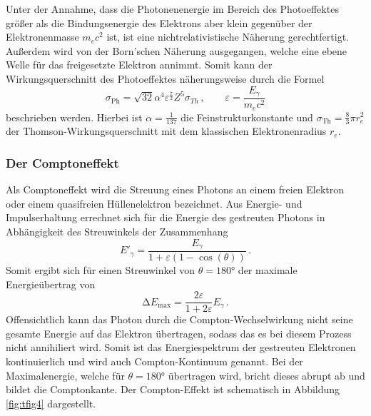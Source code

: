 Unter der Annahme, dass die Photonenenergie im Bereich des Photoeffektes größer als die Bindungsenergie des Elektrons aber klein gegenüber der Elektronenmasse $m_ec^2$ ist, ist eine nichtrelativistische Näherung gerechtfertigt.
Außerdem wird von der Born'schen Näherung ausgegangen, welche eine ebene Welle für das freigesetzte Elektron annimmt.
Somit kann der Wirkungsquerschnitt des Photoeffektes näherungsweise durch die Formel \cite{quelle03}
\begin{equation}
\sigma_{\text{Ph}}=\sqrt{32}\alpha^4 \varepsilon^\frac{7}{2}Z^5\sigma_{Th}\, , \qquad \varepsilon = \frac{E_{\gamma}}{m_e c^2}
\end{equation}
beschrieben werden.
Hierbei ist $\alpha = \frac{1}{137}$ die Feinstrukturkonstante und $\sigma_{\text{Th}}=\frac{8}{3}\pi r_e^2$ der Thomson-Wirkungsquerschnitt mit dem klassischen Elektronenradius $r_e$.

\subsubsection*{Der Comptoneffekt}
Als Comptoneffekt wird die Streuung eines Photons an einem freien Elektron oder einem quasifreien Hüllenelektron bezeichnet.
Aus Energie- und Impulserhaltung errechnet sich für die Energie des gestreuten Photons in Abhängigkeit des Streuwinkels der Zusammenhang
\begin{equation}
E'_{\gamma} = \frac{E_{\gamma}}{1 + \varepsilon(1-\cos(\theta))} \, .
\end{equation}
Somit ergibt sich für einen Streuwinkel von $\theta = 180°$ der maximale Energieübertrag von
\begin{equation}
\label{eq:compton}
\increment E_\text{max} = \frac{2\varepsilon}{1 + 2 \varepsilon} E_{\gamma} \, .
\end{equation}
Offensichtlich kann das Photon durch die Compton-Wechselwirkung nicht seine gesamte Energie auf das Elektron übertragen, sodass das es bei diesem Prozess nicht annihiliert wird.
Somit ist das Energiespektrum der gestreuten Elektronen kontinuierlich und wird auch Compton-Kontinuum genannt. 
Bei der Maximalenergie, welche für $\theta = 180°$ übertragen wird, bricht dieses abrupt ab und bildet die Comptonkante.
Der Compton-Effekt ist schematisch in Abbildung \ref{fig:tfig4} dargestellt.

